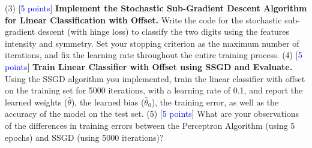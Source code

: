 \documentclass[11pt]{article}
\begin{document}
\noindent (3) [\textcolor{blue}{5 points}] \textbf{Implement the Stochastic Sub-Gradient Descent Algorithm for Linear Classification with Offset.} Write the code for the stochastic sub-gradient descent (with hinge loss) to classify the two digits using the features intensity and symmetry. Set your stopping criterion as the maximum number of iterations, and fix the learning rate throughout the entire training process.
\newline
\noindent (4) [\textcolor{blue}{5 points}] \textbf{Train Linear Classifier with Offset using SSGD and Evaluate.}
Using the SSGD algorithm you implemented, train the linear classifier with offset on the training set for 5000 iterations, with a learning rate of 0.1, and report the learned weights ($\hat{\theta}$), the learned bias ($\hat{\theta}_0$), the training error, as well as the accuracy of the model on the test set.
\newline
\noindent (5) [\textcolor{blue}{5 points}] What are your observations of the differences in training errors between the Perceptron Algorithm (using 5 epochs) and SSGD (using 5000 iterations)?
\end{document}
